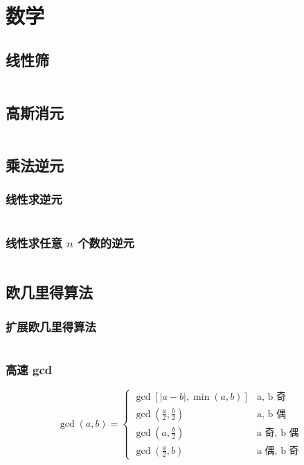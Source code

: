 \section{数学}

\subsection{线性筛}

\inputminted{cpp}{icpc/math/prime/prime.cpp}

\subsection{高斯消元}

\inputminted{cpp}{icpc/math/gauss/gauss.cpp}

\subsection{乘法逆元}

\subsubsection{线性求逆元}

\inputminted{cpp}{icpc/math/inv/inv.cpp}

\subsubsection{线性求任意 $n$ 个数的逆元}

\inputminted{cpp}{icpc/math/inv/inv_any.cpp}

\subsection{欧几里得算法}

\subsubsection{扩展欧几里得算法}

\inputminted[mathescape]{cpp}{icpc/math/gcd/ex_eculid.cpp}

\subsubsection{高速 gcd}

\[
\gcd\left(a, b\right) = \begin{cases}
\gcd\left[|a - b|, \min(a, b)\right] & \text{a, b 奇} \\
\gcd\left(\frac{a}{2}, \frac{b}{2}\right) & \text{a, b 偶} \\
\gcd\left(a, \frac{b}{2}\right) & \text{a 奇, b 偶} \\
\gcd\left(\frac{a}{2}, b\right) & \text{a 偶, b 奇} 
\end{cases}
\]

